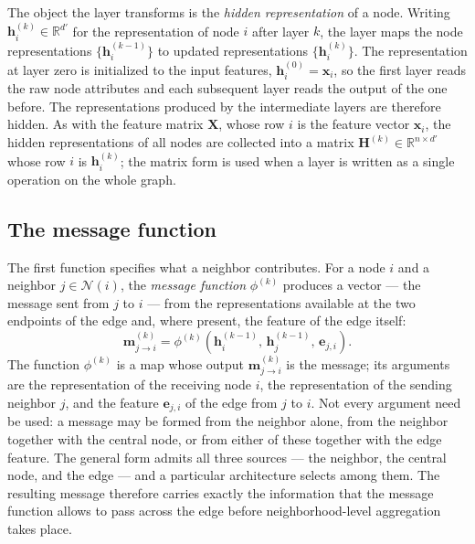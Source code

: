 The object the layer transforms is the \textit{hidden representation} of a
node. Writing $\mathbf{h}_i^{(k)} \in \mathbb{R}^{d'}$ for the representation of
node $i$ after layer $k$, the layer maps the node representations
$\{\mathbf{h}_i^{(k-1)}\}$ to updated representations $\{\mathbf{h}_i^{(k)}\}$.
The representation at layer zero is initialized to the input features,
$\mathbf{h}_i^{(0)} = \mathbf{x}_i$, so the first layer reads the raw node
attributes and each subsequent layer reads the output of the one before.
The representations produced by the intermediate layers are therefore hidden. 
As with the feature matrix $\mathbf{X}$, whose row $i$ is the feature vector
$\mathbf{x}_i$, the hidden representations of all nodes are collected into a
matrix $\mathbf{H}^{(k)} \in \mathbb{R}^{n \times d'}$ whose row $i$ is
$\mathbf{h}_i^{(k)}$; the matrix form is used when a layer is written as a
single operation on the whole graph.

\subsection{The message function}
\label{sec:message-function}

The first function specifies what a neighbor contributes. For a node $i$ and a
neighbor $j \in \mathcal{N}(i)$, the \textit{message function} $\phi^{(k)}$
produces a vector --- the message sent from $j$ to $i$ --- from the
representations available at the two endpoints of the edge and, where present,
the feature of the edge itself:
\begin{equation}
  \mathbf{m}_{j \to i}^{(k)}
    = \phi^{(k)}\!\left(
        \mathbf{h}_i^{(k-1)},\,
        \mathbf{h}_j^{(k-1)},\,
        \mathbf{e}_{j,i}
      \right).
  \label{eq:message-function}
\end{equation}
The function $\phi^{(k)}$ is a map whose output $\mathbf{m}_{j \to
i}^{(k)}$ is the message; its arguments are the representation of the receiving
node $i$, the representation of the sending neighbor $j$, and the feature
$\mathbf{e}_{j,i}$ of the edge from $j$ to $i$. Not every
argument need be used: a message may be formed from the neighbor alone, from
the neighbor together with the central node, or from either of these together
with the edge feature. The general form admits all three sources --- the
neighbor, the central node, and the edge --- and a particular architecture
selects among them. 
\newpage
The resulting message therefore carries exactly the information that the 
message function allows to pass across the edge before 
neighborhood-level aggregation takes place.


